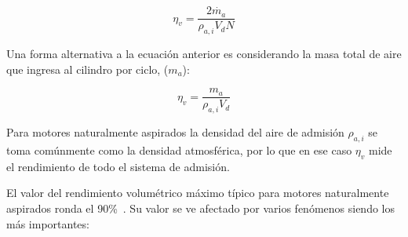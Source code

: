 \begin{equation}\label{eq:eta_v}
  \eta_v = \frac{2\dot{m_a}}{\rho_{a,i}V_d N}
\end{equation}


Una forma alternativa a la ecuación anterior es considerando la masa total de aire que
ingresa al cilindro por ciclo, ($m_{a}$):

\begin{equation}\label{eq:eta_v_alt}
  \eta_v = \frac{m_a}{\rho_{a,i}V_d}
\end{equation}

Para motores naturalmente aspirados la densidad del aire de admisión
$\rho_{a,i}$ se toma comúnmente como la densidad atmosférica, por lo que en ese
caso $\eta_v$ mide el rendimiento de todo el sistema de admisión.
%

El valor del rendimiento volumétrico máximo típico para motores naturalmente
aspirados ronda el 90\%~\parencite{heywood}.
%
Su valor se ve afectado por varios fenómenos siendo los más importantes:

